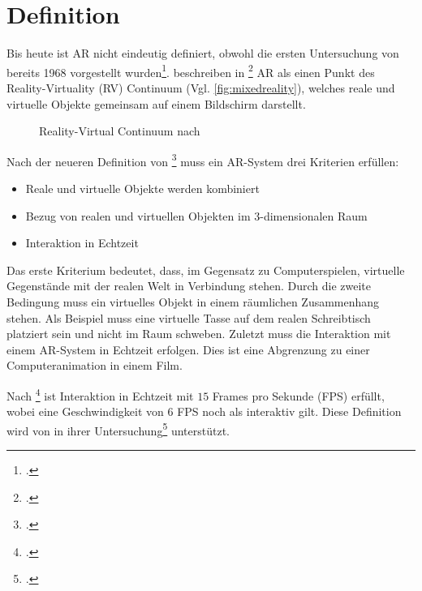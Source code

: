 \section{Definition} %
\label{sec:definition}
\begin{comment}
	Definiere Begriffe der Augmented Reality und Bildverarbeitung, die dem Leser nicht geläufig sind. Denke dabei an Prof. Klocke als Leser ohne besonderen Kenntnisstand in der AR/Bildverarbeitung.

	Azuma Definition der AR
	Milgram + Kishino MR oder nur Milgram Definition MR
\end{comment}

Bis heute ist \gls{AR} nicht eindeutig definiert, obwohl die ersten Untersuchung von \citeauthor{sutherland} bereits
 1968 vorgestellt wurden\footcite{sutherland}. \citeauthor{milgram94b} beschreiben in
 \footcite{milgram94b} \gls{AR} als einen Punkt des Reality-Virtuality (RV) Continuum
 (Vgl. \autoref{fig:mixedreality}), welches reale und virtuelle Objekte gemeinsam auf einem Bildschirm darstellt.
\begin{figure}[!ht]
	\centering
	
	\caption{Reality-Virtual Continuum nach \citeauthor{milgram94b}}
	\label{fig:mixedreality}
\end{figure}

Nach der neueren Definition von \citeauthor{azuma97}\footcite{azuma97} muss ein \gls{AR}-System drei Kriterien
 erfüllen:
\begin{itemize}
	\item Reale und virtuelle Objekte werden kombiniert
	\item Bezug von realen und virtuellen Objekten im 3-dimensionalen Raum
	\item Interaktion in Echtzeit
\end{itemize}
Das erste Kriterium bedeutet, dass, im Gegensatz zu Computerspielen, virtuelle Gegenstände mit der realen Welt in
 Verbindung stehen. Durch die zweite Bedingung muss ein virtuelles Objekt in einem räumlichen Zusammenhang stehen. Als
 Beispiel muss eine virtuelle Tasse auf dem realen Schreibtisch platziert sein und nicht im Raum schweben. Zuletzt muss
 die Interaktion mit einem \gls{AR}-System in Echtzeit erfolgen. Dies ist eine Abgrenzung zu einer Computeranimation in
 einem Film.

Nach \citeauthor{moeller2008}\footcite[Vgl.][S.~1]{moeller2008} ist Interaktion in Echtzeit mit $15$ Frames pro Sekunde
 (FPS) erfüllt, wobei eine Geschwindigkeit von $6$ FPS noch als interaktiv gilt. Diese Definition wird von
 \citeauthor{wagner09b} in ihrer Untersuchung\footcite[Vgl.][S.~8--9]{wagner09b} unterstützt.

